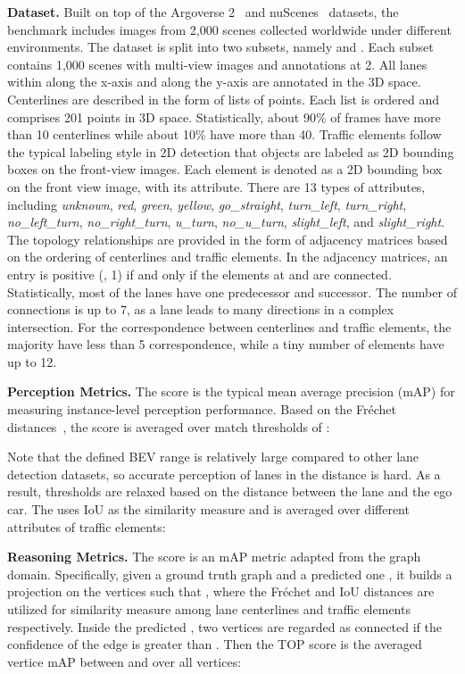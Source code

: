 \smallskip
\noindent
\textbf{Dataset.}
Built on top of the Argoverse 2~\citep{wilson2av2} and nuScenes~\citep{caesar2020nuscenes} datasets, the \datasetname benchmark includes images from 2,000 scenes collected worldwide under different environments.
The dataset is split into two subsets, namely  and .
Each subset contains 1,000 scenes with multi-view images and annotations at 2.
All lanes within  along the x-axis and  along the y-axis are annotated in the 3D space.
Centerlines are described in the form of lists of points.
Each list is ordered and comprises 201 points in 3D space.
Statistically, about 90\% of frames have more than 10 centerlines while about 10\% have more than 40.
Traffic elements follow the typical labeling style in 2D detection that objects are labeled as 2D bounding boxes on the front-view images.
Each element is denoted as a 2D bounding box on the front view image, with its attribute.
There are 13 types of attributes, including \textit{unknown}, \textit{red}, \textit{green}, \textit{yellow}, \textit{go\_straight}, \textit{turn\_left}, \textit{turn\_right}, \textit{no\_left\_turn}, \textit{no\_right\_turn}, \textit{u\_turn}, \textit{no\_u\_turn}, \textit{slight\_left}, and \textit{slight\_right}.
The topology relationships are provided in the form of adjacency matrices based on the ordering of centerlines and traffic elements.
In the adjacency matrices, an entry  is positive (\ie, 1) if and only if the elements at  and  are connected.
Statistically, most of the lanes have one predecessor and successor. 
The number of connections is up to 7, as a lane leads to many directions in a complex intersection.
For the correspondence between centerlines and traffic elements, the majority have less than 5 correspondence, while a tiny number of elements have up to 12.

\smallskip
\noindent
\textbf{Perception Metrics.}
The  score is the typical mean average precision (mAP) for measuring instance-level perception performance.
Based on the Fr\'echet distances~\cite{eiter1994frechet}, the  score is averaged over match thresholds of :

Note that the defined BEV range is relatively large compared to other lane detection datasets, so accurate perception of lanes in the distance is hard. 
As a result, thresholds  are relaxed based on the distance between the lane and the ego car.
The  uses IoU as the similarity measure and is averaged over different attributes  of traffic elements:



\smallskip
\noindent
\textbf{Reasoning Metrics.}
The  score is an mAP metric adapted from the graph domain.
Specifically, given a ground truth graph  and a predicted one , it builds a projection on the vertices such that , where the Fr\'{e}chet and IoU distances are utilized for similarity measure among lane centerlines and traffic elements respectively.
Inside the predicted , two vertices are regarded as connected if the confidence of the edge is greater than .
Then the TOP score is the averaged vertice mAP between  and  over all vertices:

